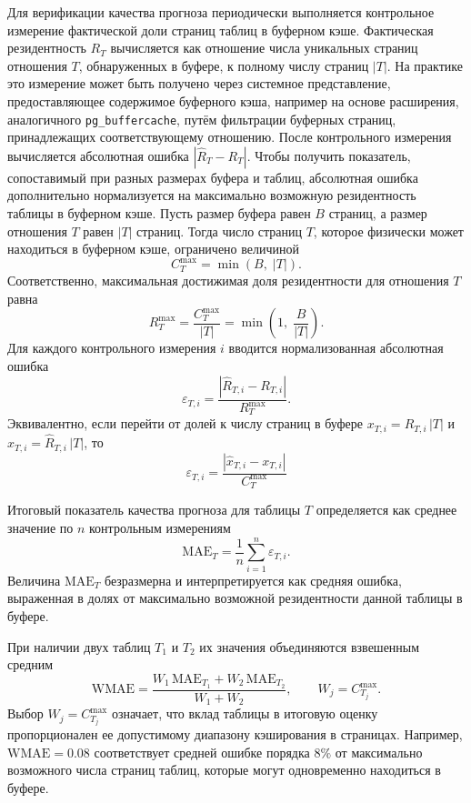 Для верификации качества прогноза периодически выполняется контрольное измерение фактической доли страниц таблиц в буферном кэше. Фактическая резидентность \(R_T\) вычисляется как отношение числа уникальных страниц отношения \(T\), обнаруженных в буфере, к полному числу страниц \(|T|\). На практике это измерение может быть получено через системное представление, предоставляющее содержимое буферного кэша, например на основе расширения, аналогичного \texttt{pg\_buffercache}, путём фильтрации буферных страниц, принадлежащих соответствующему отношению. После контрольного измерения вычисляется абсолютная ошибка \(|\widehat{R}_T - R_T|\).
Чтобы получить показатель, сопоставимый при разных размерах буфера и таблиц, абсолютная ошибка дополнительно нормализуется на максимально возможную резидентность таблицы в буферном кэше.
Пусть размер буфера равен \(B\) страниц, а размер отношения \(T\) равен \(|T|\) страниц.
Тогда число страниц \(T\), которое физически может находиться в буферном кэше, ограничено величиной
\begin{equation}
C_T^{\max} = \min(B,\; |T|).
\end{equation}
Соответственно, максимальная достижимая доля резидентности для отношения \(T\) равна
\begin{equation}
R_T^{\max} = \frac{C_T^{\max}}{|T|} = \min\!\left(1,\; \frac{B}{|T|}\right).
\end{equation}
Для каждого контрольного измерения \(i\) вводится нормализованная абсолютная ошибка
\begin{equation}
\varepsilon_{T,i} = \frac{\left|\widehat{R}_{T,i} - R_{T,i}\right|}{R_T^{\max}}.
\end{equation}
Эквивалентно, если перейти от долей к числу страниц в буфере \(x_{T,i} = R_{T,i}\,|T|\) и \(\hat{x}_{T,i} = \widehat{R}_{T,i}\,|T|\), то
\begin{equation}
\varepsilon_{T,i} = \frac{|\hat{x}_{T,i}-x_{T,i}|}{C_T^{\max}}
\end{equation}

Итоговый показатель качества прогноза для таблицы \(T\) определяется как среднее значение по \(n\) контрольным измерениям
\begin{equation}
\mathrm{MAE}_T = \frac{1}{n}\sum_{i=1}^{n}\varepsilon_{T,i}.
\end{equation}
Величина \(\mathrm{MAE}_T\) безразмерна и интерпретируется как средняя ошибка, выраженная в долях от максимально возможной резидентности данной таблицы в буфере.

При наличии двух таблиц \(T_1\) и \(T_2\) их значения объединяются взвешенным средним
\begin{equation}
\mathrm{WMAE} = \frac{W_1\,\mathrm{MAE}_{T_1} + W_2\,\mathrm{MAE}_{T_2}}{W_1 + W_2},
\qquad
W_j = C_{T_j}^{\max}.
\end{equation}
Выбор \(W_j = C_{T_j}^{\max}\) означает, что вклад таблицы в итоговую оценку пропорционален ее допустимому диапазону кэширования в страницах. Например, \(\mathrm{WMAE}=0.08\) соответствует средней ошибке порядка \(8\%\) от максимально возможного числа страниц таблиц, которые могут одновременно находиться в буфере.

